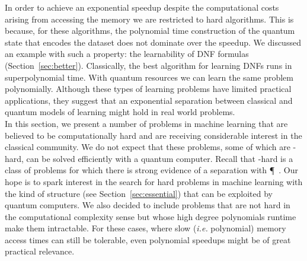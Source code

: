 \documentclass[a4paper, 11pt]{article}
\begin{document}
In order to achieve an exponential speedup despite the computational costs arising from accessing the memory we are restricted to hard algorithms. This is because, for these algorithms, the polynomial time construction of the quantum state that encodes the dataset does not dominate over the speedup. We discussed an example with such a property: the learnability of DNF formulas (Section~\ref{sec:better}). Classically, the best algorithm for learning DNFs runs in superpolynomial time. With quantum resources we can learn the same problem polynomially. Although these types of learning problems have limited practical applications, they suggest that an exponential separation between classical and quantum models of learning might hold in real world problems. \\

In this section, we present a number of problems in machine learning that are believed to be computationally hard and are receiving considerable interest in the classical community. We do not expect that these problems, some of which are \NP-hard, can be solved efficiently with a quantum computer. Recall that \NP-hard is a class of problems for which there is strong evidence of a separation with \P~\cite{fortnow2009status}. Our hope is to spark interest in the search for hard problems in machine learning with the kind of structure (see Section~\ref{sec:essential}) that can be exploited by quantum computers. We also decided to include problems that are not hard in the computational complexity sense but whose high degree polynomials runtime make them intractable. For these cases, where slow (\textit{i.e.} polynomial) memory access times can still be tolerable, even polynomial speedups might be of great practical relevance.
\end{document}
